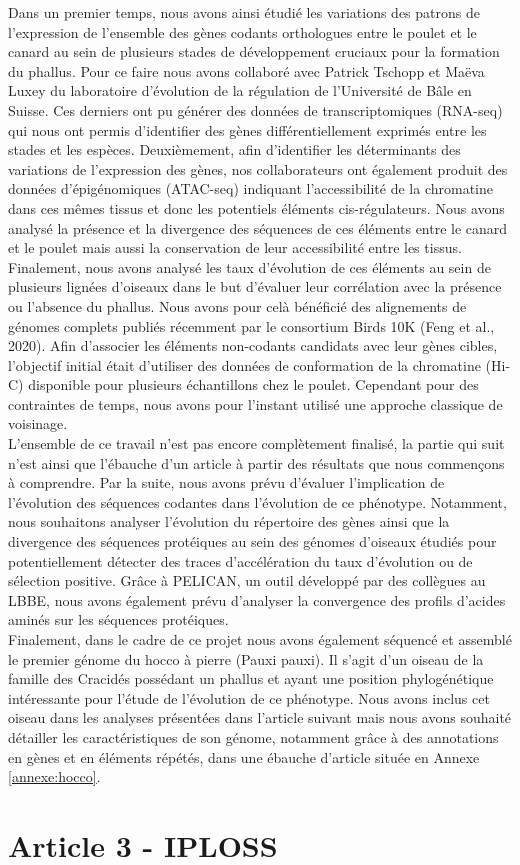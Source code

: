 Dans un premier temps, nous avons ainsi étudié les variations des patrons de l’expression de l’ensemble des gènes codants orthologues entre le poulet et le canard au sein de plusieurs stades de développement cruciaux pour la formation du phallus. Pour ce faire nous avons collaboré avec Patrick Tschopp et Maëva Luxey du laboratoire d’évolution de la régulation de l’Université de Bâle en Suisse. Ces derniers ont pu générer des données de transcriptomiques (RNA-seq) qui nous ont permis d’identifier des gènes différentiellement exprimés entre les stades et les espèces. Deuxièmement, afin d’identifier les déterminants des variations de l’expression des gènes, nos collaborateurs ont également produit des données d’épigénomiques (ATAC-seq) indiquant l’accessibilité de la chromatine dans ces mêmes tissus et donc les potentiels éléments cis-régulateurs. Nous avons analysé la présence et la divergence des séquences de ces éléments entre le canard et le poulet mais aussi la conservation de leur accessibilité entre les tissus. Finalement, nous avons analysé les taux d’évolution de ces éléments au sein de plusieurs lignées d’oiseaux dans le but d’évaluer leur corrélation avec la présence ou l’absence du phallus. Nous avons pour celà bénéficié des alignements de génomes complets publiés récemment par le consortium Birds 10K (Feng et al., 2020). Afin d’associer les éléments non-codants candidats avec leur gènes cibles, l’objectif initial était d’utiliser des données de conformation de la chromatine (Hi-C) disponible pour plusieurs échantillons chez le poulet. Cependant pour des contraintes de temps, nous avons pour l’instant utilisé une approche classique de voisinage. \\

L’ensemble de ce travail n’est pas encore complètement finalisé, la partie qui suit n’est ainsi que l’ébauche d’un article à partir des résultats que nous commençons à comprendre. Par la suite, nous avons prévu d’évaluer l’implication de l’évolution des séquences codantes dans l’évolution de ce phénotype. Notamment, nous souhaitons analyser l’évolution du répertoire des gènes ainsi que la divergence des séquences protéiques au sein des génomes d’oiseaux étudiés pour potentiellement détecter des traces d’accélération du taux d’évolution ou de sélection positive. Grâce à PELICAN, un outil développé par des collègues au LBBE, nous avons également prévu d’analyser la convergence des profils d’acides aminés sur les séquences protéiques.\\

Finalement, dans le cadre de ce projet nous avons également séquencé et assemblé le premier génome du hocco à pierre (Pauxi pauxi). Il s’agit d’un oiseau de la famille des Cracidés possédant un phallus et ayant une position phylogénétique intéressante pour l’étude de l’évolution de ce phénotype. Nous avons inclus cet oiseau dans les analyses présentées dans l’article suivant mais nous avons souhaité détailler les caractéristiques de son génome, notamment grâce à des annotations en gènes et en éléments répétés, dans une ébauche d’article située en Annexe \ref{annexe:hocco}.

\section{Article 3 - IPLOSS}
\label{IPLOSS}